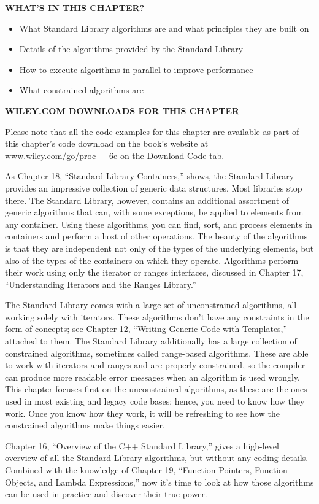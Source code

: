 \noindent
\textbf{WHAT’S IN THIS CHAPTER?}

\begin{itemize}
\item
What Standard Library algorithms are and what principles they are built on

\item
Details of the algorithms provided by the Standard Library

\item
How to execute algorithms in parallel to improve performance

\item
What constrained algorithms are
\end{itemize}

\noindent
\textbf{WILEY.COM DOWNLOADS FOR THIS CHAPTER}

Please note that all the code examples for this chapter are available as part of this chapter’s code download on the book’s website at \url{www.wiley.com/go/proc++6e} on the Download Code tab.

As Chapter 18, “Standard Library Containers,” shows, the Standard Library provides an impressive collection of generic data structures. Most libraries stop there. The Standard Library, however, contains an additional assortment of generic algorithms that can, with some exceptions, be applied to elements from any container. Using these algorithms, you can find, sort, and process elements in containers and perform a host of other operations. The beauty of the algorithms is that they are independent not only of the types of the underlying elements, but also of the types of the containers on which they operate. Algorithms perform their work using only the iterator or ranges interfaces, discussed in Chapter 17, “Understanding Iterators and the Ranges Library.”

The Standard Library comes with a large set of unconstrained algorithms, all working solely with iterators. These algorithms don’t have any constraints in the form of concepts; see Chapter 12, “Writing Generic Code with Templates,” attached to them. The Standard Library additionally has a large collection of constrained algorithms, sometimes called range-based algorithms. These are able to work with iterators and ranges and are properly constrained, so the compiler can produce more readable error messages when an algorithm is used wrongly. This chapter focuses first on the unconstrained algorithms, as these are the ones used in most existing and legacy code bases; hence, you need to know how they work. Once you know how they work, it will be refreshing to see how the constrained algorithms make things easier.

Chapter 16, “Overview of the C++ Standard Library,” gives a high-level overview of all the Standard Library algorithms, but without any coding details. Combined with the knowledge of Chapter 19, “Function Pointers, Function Objects, and Lambda Expressions,” now it’s time to look at how those algorithms can be used in practice and discover their true power.